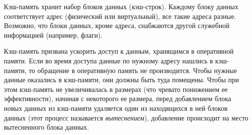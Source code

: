 \documentclass[14pt]{extreport}
\newcommand{\LRU}{\textsf{LRU}\xspace}
\newcommand{\FIFO}{\textsf{FIFO}\xspace}
\newcommand{\PseudoLRU}{\textsf{Pseudo-LRU}\xspace}
\begin{document}

Кэш-память хранит набор блоков данных (кэш-строк). Каждому блоку данных соответствует адрес (физический или виртуальный), все такие адреса разные. Возможно, что блоки данных, кроме адреса, снабжаются другой служебной информацией (например, флаги).

Кэш-память призвана ускорить доступ к данным, хранящимся в оперативной памяти. Если во время доступа данные по нужному адресу нашлись в кэш-памяти, то обращение в оперативную память не производится. Чтобы нужные данные оказались в кэш-памяти, они должны быть туда помещены. Чтобы при этом кэш-память не увеличивалась в размерах (что чревато понижением ее эффективности), начиная с некоторого ее размера, перед добавлением блока новых данных из кэш-памяти удаляется один из находящихся в ней блоков данных (этот процесс называется \emph{вытеснением}), добавление происходит на место вытесненного блока данных.
\end{document}
